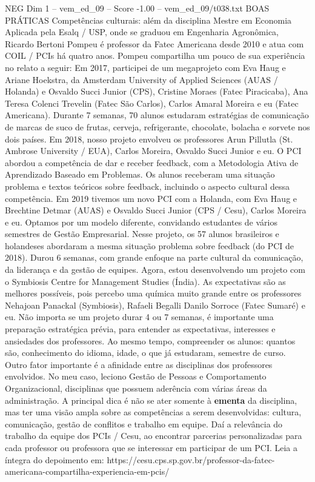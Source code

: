 \begin{textsample}{NEG Dim 1 – vem\_ed\_09 – Score -1.00 – vem\_ed\_09/t038.txt}  \label{ex:f1_neg_014}
BOAS PRÁTICAS Competências culturais: além da disciplina Mestre em Economia Aplicada pela Esalq / USP, onde se graduou em Engenharia Agronômica, Ricardo Bertoni Pompeu é professor da Fatec Americana desde 2010 e atua com COIL / PCIs há quatro anos.
Pompeu compartilha um pouco de sua experiência no relato a seguir: Em 2017, participei de um megaprojeto com Eva Haug e Ariane Hoekstra, da Amsterdam University of Applied Sciences (AUAS / Holanda) e Osvaldo Succi Junior (CPS), Cristine Moraes (Fatec Piracicaba), Ana Teresa Colenci Trevelin (Fatec São Carlos), Carlos Amaral Moreira e eu (Fatec Americana).
Durante 7 semanas, 70 alunos estudaram estratégias de comunicação de marcas de suco de frutas, cerveja, refrigerante, chocolate, bolacha e sorvete nos dois países.
Em 2018, nosso projeto envolveu os professores Arun Pillutla (St.
Ambrose University / EUA), Carlos Moreira, Osvaldo Succi Junior e eu.
O PCI abordou a competência de dar e receber feedback, com a Metodologia Ativa de Aprendizado Baseado em Problemas.
Os alunos receberam uma situação problema e textos teóricos sobre feedback, incluindo o aspecto cultural dessa competência.
Em 2019 tivemos um novo PCI com a Holanda, com Eva Haug e Brechtine Detmar (AUAS) e Osvaldo Succi Junior (CPS / Cesu), Carlos Moreira e eu.
Optamos por um modelo diferente, convidando estudantes de vários semestres de Gestão Empresarial.
Nesse projeto, os 57 alunos brasileiros e holandeses abordaram a mesma situação problema sobre feedback (do PCI de 2018).
Durou 6 semanas, com grande enfoque na parte cultural da comunicação, da liderança e da gestão de equipes.
Agora, estou desenvolvendo um projeto com o Symbiosis Centre for Management Studies (Índia).
As expectativas são as melhores possíveis, pois percebo uma química muito grande entre os professores Nehajoan Panackal (Symbiosis), Rafaeli Begalli Danilo Sorroce (Fatec Sumaré) e eu.
Não importa se um projeto durar 4 ou 7 semanas, é importante uma preparação estratégica prévia, para entender as expectativas, interesses e ansiedades dos professores.
Ao mesmo tempo, compreender os alunos: quantos são, conhecimento do idioma, idade, o que já estudaram, semestre de curso.
Outro fator importante é a afinidade entre as disciplinas dos professores envolvidos.
No meu caso, leciono Gestão de Pessoas e Comportamento Organizacional, disciplinas que possuem aderência com várias áreas da administração.
A principal dica é não se ater somente à \textbf{ementa} da disciplina, mas ter uma visão ampla sobre as competências a serem desenvolvidas: cultura, comunicação, gestão de conflitos e trabalho em equipe.
Daí a relevância do trabalho da equipe dos PCIs / Cesu, ao encontrar parcerias personalizadas para cada professor ou professora que se interessar em participar de um PCI.
Leia a íntegra do depoimento em: https://cesu.cps.sp.gov.br/professor-da-fatec-americana-compartilha-experiencia-em-pcis/

\end{textsample}

